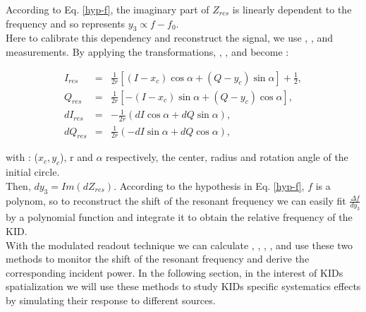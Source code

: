 According to Eq. \ref{hyp-f}, the imaginary part of $Z_{res}$ is linearly dependent to the frequency and so represents $y_{3} \propto f - f_{0}$.\\
Here to calibrate this dependency and reconstruct the signal, we use \I, \Q, \di and \dq measurements. By applying the transformations, \I, \Q, \di and \dq become : 

\begin{eqnarray}
I_{res} &=& \frac{1}{2r}[(I-x_{c}) \cos \alpha + (Q - y_{c}) \sin \alpha] + \frac{1}{2}, \\
Q_{res} &=& \frac{1}{2r}[-(I-x_{c}) \sin \alpha + (Q - y_{c}) \cos \alpha], \\
dI_{res} &=& -\frac{1}{2r}(dI \cos \alpha + dQ \sin \alpha), \\
dQ_{res} &=& \frac{1}{2r}(-dI \sin \alpha + dQ \cos \alpha),
\end{eqnarray}

with : ($x_{c}, y_{c}$), r and $\alpha$ respectively, the center, radius and rotation angle of the initial circle.\\
Then, $dy_{3} = Im(dZ_{res})$. According to the hypothesis in Eq. \ref{hyp-f}, $f$ is a polynom, so to reconstruct the shift of the resonant frequency we can easily fit $\frac{\Delta f}{dy_{3}}$ by a polynomial function and integrate it to obtain the relative frequency of the KID.\\

With the modulated readout technique we can calculate \I, \Q, \di, \dq, and use these two methods to monitor the shift of the resonant frequency and derive the corresponding incident power. In the following section, in the interest of KIDs spatialization we will use these methods to study KIDs specific systematics effects by simulating their response to different sources.